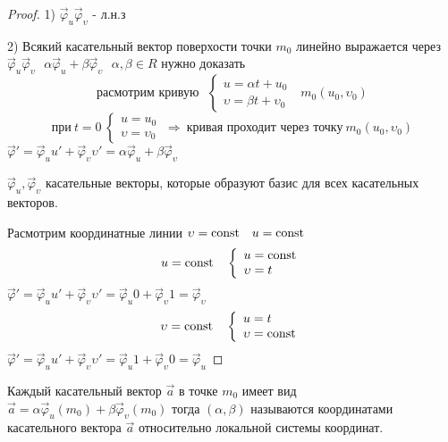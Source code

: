 \begin{proof}
  1) $\vec \varphi_u \vec \varphi_{\upsilon}$ - л.н.з

  2) Всякий касательный вектор поверхости точки $m_0$ линейно выражается через
  $\vec \varphi_u \vec \varphi_{\upsilon} ~~~ \alpha \vec \varphi_u +\beta
  \vec \varphi_{\upsilon} ~~~ \alpha, \beta \in R$ нужно доказать
  $$
  \text{расмотрим кривую} ~~~
  \left\{
    \begin{array}{l}
      u = \alpha t + u_0 \\
      \upsilon = \beta t + \upsilon_0
    \end{array}
  \right. ~~~ m_0 (u_0, \upsilon_0)
  $$
  $$
  \text{при} ~ t = 0 ~
  \left\{
    \begin{array}{l}
      u = u_0 \\
      \upsilon = \upsilon_0
    \end{array}
  \right. ~ \Rightarrow ~ \text{кривая проходит через точку} ~
  m_0 (u_0, \upsilon_0)
  $$
  $\vec \varphi' = \vec \varphi_u u' + \vec \varphi_{\upsilon}
  \upsilon' = \alpha \vec \varphi_u + \beta \vec \varphi_{\upsilon}$

  $\vec \varphi_u, \vec \varphi_{\upsilon}$ касательные векторы, которые
  образуют базис для всех касательных векторов.

  Расмотрим координатные линии $\upsilon = \mathrm{const} ~~~ u = \mathrm{const}$
  $$
  u = \mathrm{const} ~~~
  \left\{
    \begin{array}{l}
      u = \mathrm{const} \\
      \upsilon = t
    \end{array}
  \right.
  $$
  $\vec \varphi' = \vec \varphi_u u' + \vec \varphi_{\upsilon}
  \upsilon' = \vec \varphi_u 0 + \vec \varphi_{\upsilon} 1 =
  \vec \varphi_{\upsilon}$
  $$
  \upsilon = \mathrm{const} ~~~
  \left\{
    \begin{array}{l}
      u = t \\
      \upsilon = \mathrm{const}
    \end{array}
  \right.
  $$
  $\vec \varphi' = \vec \varphi_u u' + \vec \varphi_{\upsilon}
  \upsilon' = \vec \varphi_u 1 + \vec \varphi_{\upsilon} 0 = \vec \varphi_u$
\end{proof}

\begin{define}
  Каждый касательный вектор $\vec a$ в точке $m_0$ имеет вид $\vec a =
  \alpha \vec \varphi_u(m_0) + \beta \vec \varphi_{\upsilon}(m_0)$ тогда
  $(\alpha, \beta)$ называются
  координатами касательного вектора $\vec a$ относительно локальной системы
  координат.
\end{define}

